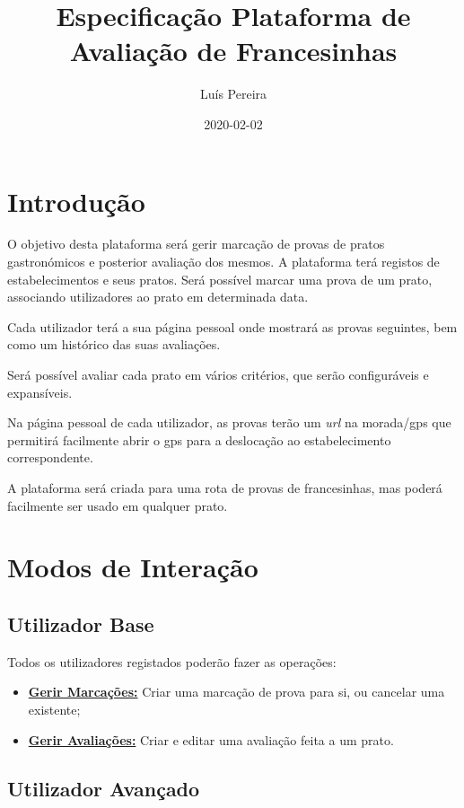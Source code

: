 \documentclass[11pt, a4paper, sans]{article}
\title{Especificação Plataforma de Avaliação de Francesinhas}
\date{2020-02-02}
\author{Luís Pereira}
\begin{document}
	\maketitle
	\newpage
	
	\tableofcontents
	\newpage

	\section{Introdução}
	
	O objetivo desta plataforma será gerir marcação de provas de pratos gastronómicos e posterior
	avaliação dos mesmos. A plataforma terá registos de estabelecimentos e seus pratos. Será possível marcar
	uma prova de um prato, associando utilizadores ao prato em determinada data. 

	Cada utilizador terá a sua página pessoal onde mostrará as provas seguintes, bem como um histórico das 
	suas avaliações.

	Será possível avaliar cada prato em vários critérios, que serão configuráveis e expansíveis.

	Na página pessoal de cada utilizador, as provas terão um \textit{url} na morada/gps que permitirá 
	facilmente abrir o gps para a deslocação ao estabelecimento correspondente.

	A plataforma será criada para uma rota de provas de francesinhas, mas poderá facilmente ser 
	usado em qualquer prato.

	\section{Modos de Interação}

	\subsection{Utilizador Base}

	Todos os utilizadores registados poderão fazer as operações:

	\begin{itemize}
		\item \underline{\textbf{Gerir Marcações:}} Criar uma marcação de prova para si, ou cancelar uma existente;
		\item \underline{\textbf{Gerir Avaliações:}} Criar e editar uma avaliação feita a um prato.
	\end{itemize}

	\subsection{Utilizador Avançado}
\end{document}
